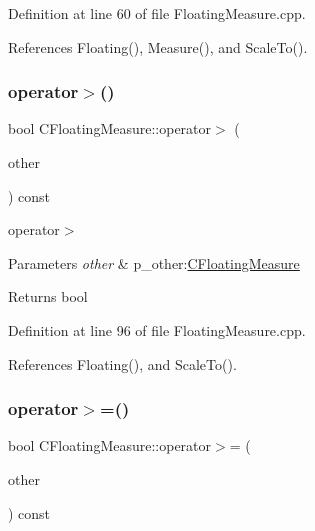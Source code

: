 Definition at line 60 of file Floating\+Measure.\+cpp.



References Floating(), Measure(), and Scale\+To().

\mbox{\label{classCFloatingMeasure_a59cd04759c33941c7c20db3c81dcde14}} 
\subsubsection{\texorpdfstring{operator$>$()}{operator>()}}
{\footnotesize\ttfamily bool C\+Floating\+Measure\+::operator$>$ (\begin{DoxyParamCaption}\item[{const \hyperlink{classCFloatingMeasure}{C\+Floating\+Measure} \&}]{other }\end{DoxyParamCaption}) const}



operator$>$ 


\begin{DoxyParams}{Parameters}
{\em other} & p\+\_\+other\+:\hyperlink{classCFloatingMeasure}{C\+Floating\+Measure} \\
\hline
\end{DoxyParams}
\begin{DoxyReturn}{Returns}
bool 
\end{DoxyReturn}


Definition at line 96 of file Floating\+Measure.\+cpp.



References Floating(), and Scale\+To().

\mbox{\label{classCFloatingMeasure_aa6575f6f658ee524da9e5f123189cef1}} 
\subsubsection{\texorpdfstring{operator$>$=()}{operator>=()}}
{\footnotesize\ttfamily bool C\+Floating\+Measure\+::operator$>$= (\begin{DoxyParamCaption}\item[{const \hyperlink{classCFloatingMeasure}{C\+Floating\+Measure} \&}]{other }\end{DoxyParamCaption}) const}



